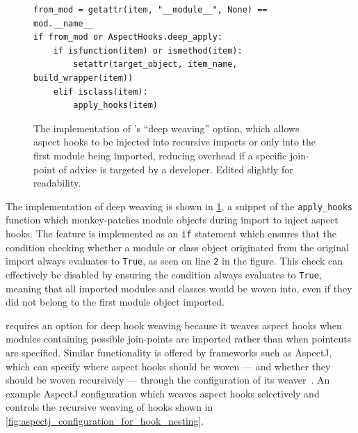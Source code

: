 \begin{figure}
    \begin{lstlisting}[style=footnotesize_python]
from_mod = getattr(item, "__module__", None) == mod.__name__
if from_mod or AspectHooks.deep_apply:
    if isfunction(item) or ismethod(item):
        setattr(target_object, item_name, build_wrapper(item))
    elif isclass(item):
        apply_hooks(item)
    \end{lstlisting}
    \caption{The implementation of \pdsfthree{}'s ``deep weaving'' option, which
    allows aspect hooks to be injected into recursive imports or only into the
    first module being imported, reducing overhead if a specific join-point of
    advice is targeted by a developer. Edited slightly for readability.}
    \label{fig:deep_weaving_optimisation_implementation}
\end{figure}

The implementation of deep weaving is shown in
\cref{fig:deep_weaving_optimisation_implementation}, a snippet of the
\lstinline{apply_hooks} function which monkey-patches module objects during
import to inject aspect hooks. The feature is implemented as an \lstinline{if}
statement which ensures that the condition checking whether a module or class
object originated from the original import always evaluates to \lstinline{True}, as seen
on line \texttt{2} in the figure. This check can effectively be disabled by
ensuring the condition always evaluates to \lstinline{True}, meaning that all
imported modules and classes would be woven into, even if they did not belong to
the first module object imported.

\pdsfthree requires an option for deep hook weaving because it weaves aspect hooks
when modules containing possible join-points are imported rather than when
pointcuts are specified. Similar functionality is offered by \aop frameworks
such as AspectJ, which can specify where aspect hooks should be woven --- and
whether they should be woven recursively --- through the configuration of its
weaver~\cite{}. An example AspectJ configuration which weaves aspect hooks
selectively and controls the recursive weaving of hooks shown in
\cref{fig:aspectj_configuration_for_hook_nesting}.


